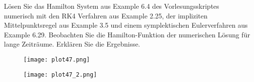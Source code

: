 \begin{exercise}
  Lösen Sie das Hamilton System aus Example 6.4 des Vorlesungsskriptes
  numerisch mit den RK4 Verfahren aus Example 2.25, der impliziten
  Mittelpunktsregel aus Example 3.5 und einem symplektischen
  Eulerverfahren aus Example 6.29. Beobachten Sie die
  Hamilton-Funktion der numerischen Lösung für lange Zeiträume.
  Erklären Sie die Ergebnisse.
\end{exercise}

\begin{solution}
\begin{figure}
    \centering
    \texttt{[image: plot47.png]}
\end{figure}
\begin{figure}
    \centering
    \texttt{[image: plot47\_2.png]}
\end{figure}
\FloatBarrier
\end{solution}
